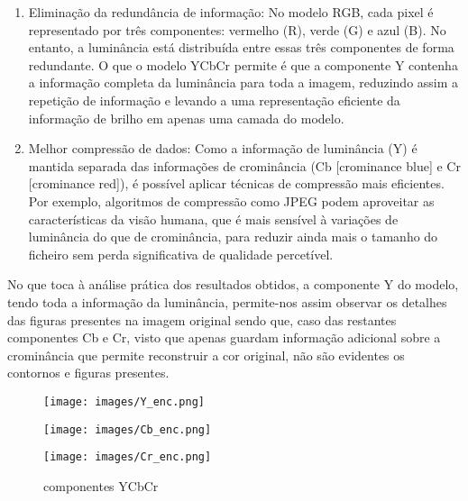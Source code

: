 \documentclass{article}
\begin{document}
\begin{enumerate}
    \item Eliminação da redundância de informação: No modelo RGB, cada pixel é representado por três componentes: vermelho (R), verde (G) e azul (B). No entanto, a luminância está distribuída entre essas três componentes de forma redundante. O que o modelo YCbCr permite é que a componente Y contenha a informação completa da luminância para toda a imagem, reduzindo assim a repetição de informação e levando a uma representação eficiente da informação de brilho em apenas uma camada do modelo.
    \item Melhor compressão de dados: Como a informação de luminância (Y) é mantida separada das informações de crominância (Cb [crominance blue] e Cr [crominance red]), é possível aplicar técnicas de compressão mais eficientes. Por exemplo, algoritmos de compressão como JPEG podem aproveitar as características da visão humana, que é mais sensível à variações de luminância do que de crominância, para reduzir ainda mais o tamanho do ficheiro sem perda significativa de qualidade percetível.
\end{enumerate}

No que toca à análise prática dos resultados obtidos, a componente Y do modelo, tendo toda a informação da luminância, permite-nos assim observar os detalhes das figuras presentes na imagem original sendo que, caso das restantes componentes Cb e Cr, visto que apenas guardam informação adicional sobre a crominância que permite reconstruir a cor original, não são evidentes os contornos e figuras presentes. \\

\begin{figure}[H]
  \centering
  \begin{minipage}[b]{0.32\textwidth}
    \centering
    \texttt{[image: images/Y\_enc.png]}
    \label{fig:Y_enc}
  \end{minipage}
  \hfill
  \begin{minipage}[b]{0.32\textwidth}
    \centering
    \texttt{[image: images/Cb\_enc.png]}
    \label{fig:Cb_enc}
  \end{minipage}
  \hfill
  \begin{minipage}[b]{0.32\textwidth}
    \centering
    \texttt{[image: images/Cr\_enc.png]}
    \label{fig:Cr_enc}
  \end{minipage}
\caption{componentes YCbCr}
\end{figure}
\end{document}
